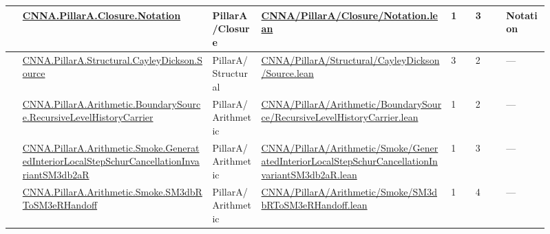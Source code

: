 \begin{longtable}{L{0.025\linewidth} L{0.315\linewidth} L{0.08\linewidth} L{0.315\linewidth} L{0.045\linewidth} L{0.055\linewidth} L{0.07\linewidth}}
\hline
{} & \href{run:repo_snapshot/CNNA/PillarA/Closure/Notation.lean}{CNNA.\allowbreak{}PillarA.\allowbreak{}Closure.\allowbreak{}Notation} & PillarA/\allowbreak{}Closure & \href{run:repo_snapshot/CNNA/PillarA/Closure/Notation.lean}{CNNA/\allowbreak{}PillarA/\allowbreak{}Closure/\allowbreak{}Notation.\allowbreak{}lean} & 1 & 3 & Notation\\
\hline
{} & \href{run:repo_snapshot/CNNA/PillarA/Structural/CayleyDickson/Source.lean}{CNNA.\allowbreak{}PillarA.\allowbreak{}Structural.\allowbreak{}CayleyDickson.\allowbreak{}Source} & PillarA/\allowbreak{}Structural & \href{run:repo_snapshot/CNNA/PillarA/Structural/CayleyDickson/Source.lean}{CNNA/\allowbreak{}PillarA/\allowbreak{}Structural/\allowbreak{}CayleyDickson/\allowbreak{}Source.\allowbreak{}lean} & 3 & 2 & ---\\
\hline
{} & \href{run:repo_snapshot/CNNA/PillarA/Arithmetic/BoundarySource/RecursiveLevelHistoryCarrier.lean}{CNNA.\allowbreak{}PillarA.\allowbreak{}Arithmetic.\allowbreak{}BoundarySource.\allowbreak{}RecursiveLevelHistoryCarrier} & PillarA/\allowbreak{}Arithmetic & \href{run:repo_snapshot/CNNA/PillarA/Arithmetic/BoundarySource/RecursiveLevelHistoryCarrier.lean}{CNNA/\allowbreak{}PillarA/\allowbreak{}Arithmetic/\allowbreak{}BoundarySource/\allowbreak{}RecursiveLevelHistoryCarrier.\allowbreak{}lean} & 1 & 2 & ---\\
\hline
{} & \href{run:repo_snapshot/CNNA/PillarA/Arithmetic/Smoke/GeneratedInteriorLocalStepSchurCancellationInvariantSM3db2aR.lean}{CNNA.\allowbreak{}PillarA.\allowbreak{}Arithmetic.\allowbreak{}Smoke.\allowbreak{}GeneratedInteriorLocalStepSchurCancellationInvariantSM3db2aR} & PillarA/\allowbreak{}Arithmetic & \href{run:repo_snapshot/CNNA/PillarA/Arithmetic/Smoke/GeneratedInteriorLocalStepSchurCancellationInvariantSM3db2aR.lean}{CNNA/\allowbreak{}PillarA/\allowbreak{}Arithmetic/\allowbreak{}Smoke/\allowbreak{}GeneratedInteriorLocalStepSchurCancellationInvariantSM3db2aR.\allowbreak{}lean} & 1 & 3 & ---\\
\hline
{} & \href{run:repo_snapshot/CNNA/PillarA/Arithmetic/Smoke/SM3dbRToSM3eRHandoff.lean}{CNNA.\allowbreak{}PillarA.\allowbreak{}Arithmetic.\allowbreak{}Smoke.\allowbreak{}SM3dbRToSM3eRHandoff} & PillarA/\allowbreak{}Arithmetic & \href{run:repo_snapshot/CNNA/PillarA/Arithmetic/Smoke/SM3dbRToSM3eRHandoff.lean}{CNNA/\allowbreak{}PillarA/\allowbreak{}Arithmetic/\allowbreak{}Smoke/\allowbreak{}SM3dbRToSM3eRHandoff.\allowbreak{}lean} & 1 & 4 & ---\\

\end{longtable}
